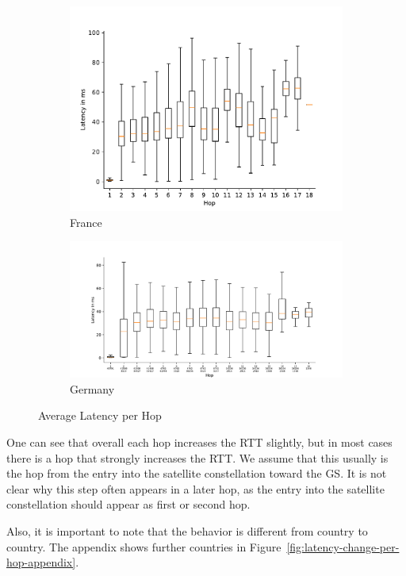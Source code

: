 \begin{figure}
	\centering
	\begin{subfigure}[b]{\linewidth}
		\includegraphics[width=\linewidth]{chapters/4-results/traceroute/img/latency-per-hop-FR.pdf}
		\caption{France}
	\end{subfigure}
	\begin{subfigure}[b]{\linewidth}
		\includegraphics[width=\linewidth]{chapters/4-results/traceroute/img/latency-per-hop-DE.pdf}
		\caption{Germany}
	\end{subfigure}
	\caption{Average Latency per Hop}
	\label{fig:latency-change-per-hop}
\end{figure}

One can see that overall each hop increases the RTT slightly, but in most cases
there is a hop that strongly increases the RTT. We assume that this usually is
the hop from the entry into the satellite constellation toward the \ac{GS}. It
is not clear why this step often appears in a later hop, as the entry into the
satellite constellation should appear as first or second hop.

Also, it is important to note that the behavior is different from country to
country. The appendix shows further countries in
Figure~\ref{fig:latency-change-per-hop-appendix}.
